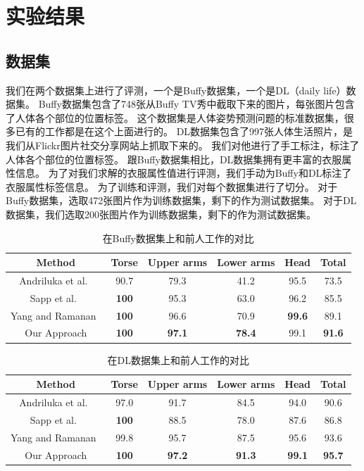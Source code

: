 
\chapter{实验结果}
\label{chap:exp}
\section{数据集}
我们在两个数据集上进行了评测，一个是Buffy数据集，一个是DL（daily life）数据集。
Buffy数据集包含了748张从Buffy TV秀中截取下来的图片，每张图片包含了人体各个部位的位置标签。
这个数据集是人体姿势预测问题的标准数据集，很多已有的工作都是在这个上面进行的。
DL数据集包含了997张人体生活照片，是我们从Flickr图片社交分享网站上抓取下来的。
我们对他进行了手工标注，标注了人体各个部位的位置标签。
跟Buffy数据集相比，DL数据集拥有更丰富的衣服属性信息。
为了对我们求解的衣服属性值进行评测，我们手动为Buffy和DL标注了衣服属性标签信息。
为了训练和评测，我们对每个数据集进行了切分。
对于Buffy数据集，选取472张图片作为训练数据集，剩下的作为测试数据集。
对于DL数据集，我们选取200张图片作为训练数据集，剩下的作为测试数据集。

\begin{table}
\centering
\caption{在Buffy数据集上和前人工作的对比}
\begin{tabular}{|c|c|c|c|c|c|} \hline
    Method & Torse & Upper arms & Lower arms & Head & Total \\ \hline
Andriluka et al.~\cite{cvpr09} &  90.7 & 79.3 & 41.2 & 95.5 & 73.5 \\ \hline
Sapp et al.~\cite{eccv10} & \textbf{100} & 95.3 & 63.0 & 96.2 & 85.5 \\ \hline
Yang and Ramanan~\cite{deva11} & \textbf{100} & 96.6 & 70.9 & \textbf{99.6} & 89.1 \\ \hline
Our Approach & \textbf{100} & \textbf{97.1} & \textbf{78.4} & 99.1 & \textbf{91.6} \\ \hline
\end{tabular}
\label{tb:buffy}
\end{table}

\begin{table}
\centering
\caption{在DL数据集上和前人工作的对比}
\begin{tabular}{|c|c|c|c|c|c|} \hline
    Method & Torse & Upper arms & Lower arms & Head & Total \\ \hline
Andriluka et al.~\cite{cvpr09} &  97.0 & 91.7 & 84.5 & 94.0 & 90.6 \\ \hline
Sapp et al.~\cite{eccv10} & \textbf{100} & 88.5 & 78.0 & 87.6 & 86.8 \\ \hline
Yang and Ramanan~\cite{deva11} & 99.8 & 95.7 & 87.5 & 95.6 & 93.6 \\ \hline
Our Approach & \textbf{100} & \textbf{97.2} & \textbf{91.3} & \textbf{99.1} & \textbf{95.7} \\ \hline
\end{tabular}
\label{tb:dl}
\end{table}

